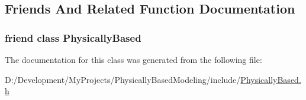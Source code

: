 \subsection{Friends And Related Function Documentation}
\hypertarget{class_p_b_time_aeee6bd23afed3d408fb21a7d857a8f3b}{
\subsubsection[{Physically\-Based}]{\setlength{\rightskip}{0pt plus 5cm}friend class Physically\-Based\hspace{0.3cm}{\ttfamily [friend]}}}\label{class_p_b_time_aeee6bd23afed3d408fb21a7d857a8f3b}


The documentation for this class was generated from the following file\-:\begin{DoxyCompactItemize}
\item 
D\-:/\-Development/\-My\-Projects/\-Physically\-Based\-Modeling/include/\hyperlink{_physically_based_8h}{Physically\-Based.\-h}\end{DoxyCompactItemize}
